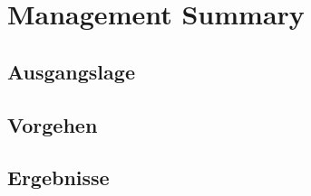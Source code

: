 \section{Management Summary}

\subsection{Ausgangslage}
\subsection{Vorgehen}

\subsection{Ergebnisse}
